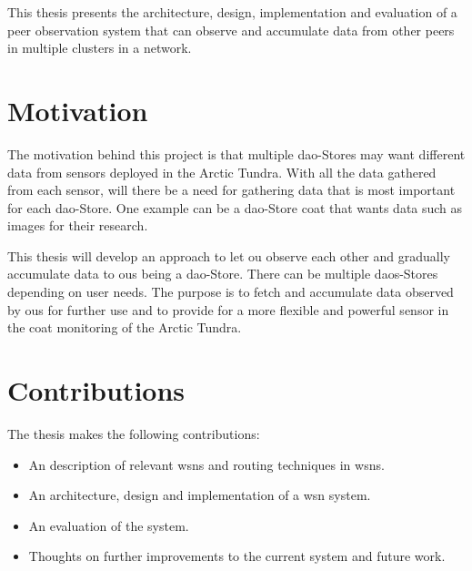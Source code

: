 \documentclass[USenglish]{uit-thesis}
\begin{document}

This thesis presents the architecture, design, implementation and evaluation of a peer observation system that can observe and accumulate data from other peers in multiple clusters in a network.


\section{Motivation}
The motivation behind this project is that multiple \gls{dao}-Stores \cite{dao} may want different data from sensors deployed in the Arctic Tundra. With all the data gathered from each sensor, will there be a need for gathering data that is most important for each \gls{dao}-Store. One example can be a \gls{dao}-Store \gls{coat} that wants data such as images for their research.

This thesis will develop an approach to let \gls{ou} observe each other and gradually accumulate data to \glspl{ou} being a \gls{dao}-Store. There can be multiple \glspl{dao}-Stores depending on user needs. The purpose is to fetch and accumulate data observed by \gls{ou}s for further use and to provide for a more flexible and powerful sensor in the \gls{coat} monitoring of the Arctic Tundra.




\section{Contributions}
The thesis makes the following contributions:

\begin{itemize}
\item An description of relevant \gls{wsn}s and routing techniques in \gls{wsn}s.
\item An architecture, design and implementation of a \gls{wsn} system.
\item An evaluation of the system.
\item Thoughts on further improvements to the current system and future work.
\end{itemize}
\end{document}

